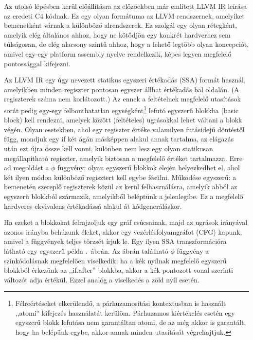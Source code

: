 Az utolsó lépésben kerül előállításra az előzőekben már említett LLVM \gls{IR} leírása az eredeti C4 kódnak.
Ez egy olyan formátuma az LLVM rendszernek, amelyiket bemenetként várnak a különböző alrendszerek.
Ez szolgál egy olyan rétegként, amelyik elég általános ahhoz, hogy ne kötődjön egy konkrét hardverhez sem túlságosan, de elég alacsony szintű ahhoz, hogy a lehető legtöbb olyan koncepciót, amivel egy-egy platform assembly nyelve rendelkezik, képes legyen megfelelő pontossággal kifejezni.

Az LLVM \gls{IR} egy úgy nevezett statikus egyszeri értékadás (\gls{SSA}) formát használ, amelyikben minden regiszter pontosan egyszer állhat értékadás bal oldalán.
(A regiszterek száma nem korlátozott.)
Az ennek a feltételnek megfelelő utasítások sorát pedig egy-egy felbonthatatlan egységként\footnote{Félreértéseket elkerülendő, a párhuzamosítási kontextusban is használt ,,atomi'' kifejezés használatát kerülöm. Párhuzamos kiértékelés esetén egy egyszerű blokk lefutása nem garantáltan atomi, de az még akkor is garantált, hogy ha belépünk egybe, akkor annak minden utasítását végrehajtjuk.} lefutó egyszerű blokkba (basic block) kell rendezni, amelyek között (feltételes) ugrásokkal lehet váltani a blokk végén.
Olyan esetekben, ahol egy regiszter értéke valamilyen futásidejű döntéstől függ, mondjuk egy if két ágán másképpen alakul annak tartalma, az elágazás után ezt újra össze kell vonni, különben nem lesz egy  olyan statikusan megállapítható regiszter,  amelyik biztosan a megfelelő értéket tartalmazza.
Erre ad megoldást a $\phi$ függvény: olyan egyszerű blokkok elején helyezkedhet el, ahol két ilyen módon különböző regisztert kell egybe fésülni.
Működése egyszerű: a bemenetén szereplő regiszterek közül az kerül felhasználásra, amelyik abból az egyszerű blokkból származik, amelyikből beléptünk a jelenlegibe. 
Ez a megfelelő hardveres ekvivalens értékadássá alakul át kódgeneráláskor.

Ha ezeket a blokkokat felrajzoljuk egy gráf csúcsainak, majd az ugrások irányával azonos irányba behúzunk éleket, akkor egy \un vezérlésfolyamgráfot (\gls{CFG}) kapunk, amivel a függvények teljes törzsét írjuk le.
Egy ilyen \gls{SSA} transzformációra látható egy egyszerű példa .~ábrán. 
Az ábrán található $\phi$ függvény a színkódolásnak megfelelően viselkedik:
ha a kék nyílnak megfelelő egyszerű blokkból érkezünk az
,,if.after'' blokkba, akkor a kék pontozott vonal szerinti változót adja értékül. 
Ezzel analóg a viselkedés a zöld nyíl esetén.

